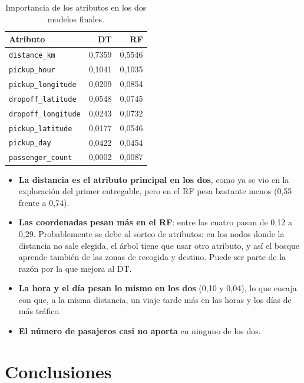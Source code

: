 \documentclass[12pt,a4paper]{article}
\begin{document}
\begin{table}[H]
\centering
\small
\begin{tabular}{lrr}
\toprule
\textbf{Atributo} & \textbf{\ac{DT}} & \textbf{\ac{RF}} \\
\midrule
\texttt{distance\_km}       & 0,7359 & 0,5546 \\
\texttt{pickup\_hour}       & 0,1041 & 0,1035 \\
\texttt{pickup\_longitude}  & 0,0209 & 0,0854 \\
\texttt{dropoff\_latitude}  & 0,0548 & 0,0745 \\
\texttt{dropoff\_longitude} & 0,0243 & 0,0732 \\
\texttt{pickup\_latitude}   & 0,0177 & 0,0546 \\
\texttt{pickup\_day}        & 0,0422 & 0,0454 \\
\texttt{passenger\_count}   & 0,0002 & 0,0087 \\
\bottomrule
\end{tabular}
\caption{Importancia de los atributos en los dos modelos finales.}
\label{tab:importancia}
\end{table}

\begin{itemize}
    \item \textbf{La distancia es el atributo principal en los dos}, como
    ya se vio en la exploración del primer entregable, pero en el \ac{RF}
    pesa bastante menos (0,55 frente a 0,74).
    \item \textbf{Las coordenadas pesan más en el \ac{RF}}: entre las cuatro
    pasan de 0,12 a 0,29. Probablemente se debe al sorteo de atributos: en los
    nodos donde la distancia no sale elegida, el árbol tiene que usar otro
    atributo, y así el bosque aprende también de las zonas de recogida y
    destino. Puede ser parte de la razón por la que mejora al \ac{DT}.
    \item \textbf{La hora y el día pesan lo mismo en los dos} (0,10 y
    0,04), lo que encaja con que, a la misma distancia, un viaje tarde más en las
    horas y los días de más tráfico.
    \item \textbf{El número de pasajeros casi no aporta} en ninguno de los
    dos.
\end{itemize}

\newpage
\section{Conclusiones}
\label{sec:conclusiones}
\end{document}
